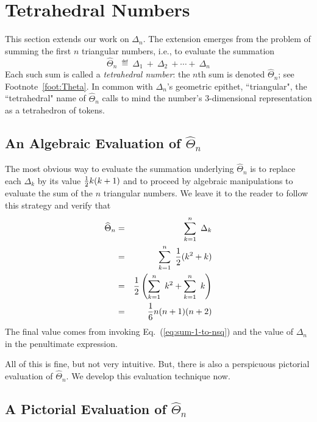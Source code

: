 \section{Tetrahedral Numbers}
\label{sec:tetraedralNumbers}

 

This section extends our work on $\Delta_n$.  The extension emerges from the problem of summing the first $n$ triangular numbers, i.e., to evaluate the summation
\[ \widehat{\Theta}_n \ \eqdef \ \Delta_1 \ + \ \Delta_2 \ + \cdots +\ \Delta_n \]
Each such sum is called a {\it tetrahedral number}: the  $n$th sum is denoted $\widehat{\Theta}_n$; see Footnote~\ref{foot:Theta}.  In common with $\Delta_n$'s geometric epithet, ``triangular", the ``tetrahedral" name of $\widehat{\Theta}_n$ calls to mind the number's 3-dimensional representation as a tetrahedron of tokens. 

\subsection{An Algebraic Evaluation of $\widehat{\Theta}_n$}

The most obvious way to evaluate the summation underlying $\widehat{\Theta}_n$ is to replace each $\Delta_k$ by its value ${1 \over 2}k (k+1)$ and to proceed by algebraic manipulations to evaluate the sum of the $n$ triangular numbers.  We leave it to the reader to follow this strategy and verify that
\begin{eqnarray*}
\widehat{\Theta}_n & = & \sum_{k=1}^{n} \ \Delta_k \\
      & = & \sum_{k=1}^{n} \ \frac{1}{2} (k^2 + k) \\
      & =  & \frac{1}{2} \left( \sum_{k=1}^{n} \ k^2 + \sum_{k=1}^{n}  \ k \right) \\
      & = & {1 \over 6} n (n+1)(n+2)
\end{eqnarray*}
The final value comes from invoking Eq.~(\ref{eq:sum-1-to-nsq}) and the value of $\Delta_n$ in the penultimate expression. 

\smallskip

All of this is fine, but not very intuitive.  But, there is also a perspicuous pictorial evaluation of $\widehat{\Theta}_n$.  We develop this evaluation technique now.

\subsection{A Pictorial Evaluation of $\widehat{\Theta}_n$}

